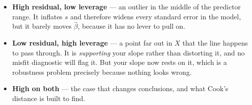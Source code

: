\documentclass[
  letterpaper,
  10pt,
  twoside,
  openright,
  numbers=noenddot,
  chapterprefix=true]{scrbook}
\providecommand{\tightlist}{%
  \setlength{\itemsep}{0pt}\setlength{\parskip}{0pt}}
\begin{document}
\begin{itemize}
\tightlist
\item
  \textbf{High residual, low leverage} --- an outlier in the middle of
  the predictor range. It inflates \(s\) and therefore widens every
  standard error in the model, but it barely moves \(\hat\beta\),
  because it has no lever to pull on.
\item
  \textbf{Low residual, high leverage} --- a point far out in \(X\) that
  the line happens to pass through. It is \emph{supporting} your slope
  rather than distorting it, and no misfit diagnostic will flag it. But
  your slope now rests on it, which is a robustness problem precisely
  because nothing looks wrong.
\item
  \textbf{High on both} --- the case that changes conclusions, and what
  Cook's distance is built to find.
\end{itemize}
\end{document}
